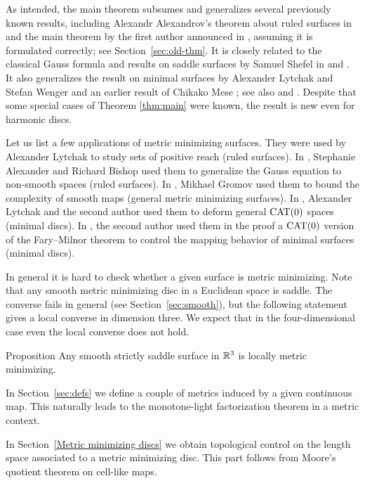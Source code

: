 \documentclass{article}
\begin{document}
As intended, the main theorem subsumes and generalizes several previously known results, including Alexandr Alexandrov's theorem about ruled surfaces in \cite{A} and 
the main theorem by the first author announced in \cite{petrunin-metric-min}, assuming it is formulated correctly; see Section~\ref{sec:old-thm}. 
It is closely related to the classical Gauss formula and results on saddle surfaces by Samuel Shefel in \cite{shefel-2D} and \cite{shefel-3D}.
It also generalizes the result on minimal surfaces by Alexander Lytchak and Stefan Wenger 
\cite[Theorem 1.2]{LW5}  and an earlier result of Chikako Mese \cite{mese};
see also \cite[Chapter 4]{akp} and \cite{petrunin-stadler}. 
Despite that some special cases of Theorem \ref{thm:main} were known, the result is new even for harmonic discs.

Let us list a few applications of metric minimizing surfaces.
They were used by Alexander Lytchak \cite{L} to study sets of positive reach (ruled surfaces).
In  \cite{AB}, Stephanie Alexander and Richard Bishop used them to generalize the Gauss equation to non-smooth spaces (ruled surfaces).
In \cite{G}, Mikhael Gromov used them to bound the complexity of smooth maps (general metric minimizing surfaces).
In \cite{LS}, Alexander Lytchak and the second author used them to deform general $\mathop{\rm CAT}\nolimits(0)$ spaces (minimal discs).
In \cite{St}, the second author used them in the proof a $\mathop{\rm CAT}\nolimits(0)$ version of the Fary--Milnor theorem to control the mapping behavior of minimal surfaces (minimal discs).  

In general it is hard to check whether a given surface is metric minimizing.
Note that any smooth metric minimizing disc in a Euclidean space is saddle.
The converse fails in general (see Section~\ref{sec:smooth}), but the following statement gives a local converse in dimension three.
We expect that in the four-dimensional case even the local converse does not hold.

\begin{thm}{Proposition}\label{prop:smooth}
Any smooth strictly saddle surface in $\mathbb{R}^3$ is locally metric minimizing.
\end{thm}
 


In Section~\ref{sec:defs} we define a couple of metrics induced by a given continuous map.
This naturally leads to the monotone-light factorization theorem in a metric context.
 
In Section~\ref{Metric minimizing discs} we obtain topological control on the length space
associated to a metric minimizing disc. 
This part follows from Moore's quotient theorem on cell-like maps.
 
\end{document}
